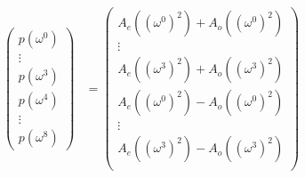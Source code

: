 \begin{align}
\begin{pmatrix}
p(\omega^0)\\
\vdots\\
p(\omega^3)\\
p(\omega^4)\\
\vdots\\
p(\omega^8)
\end{pmatrix}
&=
\begin{pmatrix}
A_e\left(\left(\omega^0\right)^2\right) + A_o\left(\left(\omega^0\right)^2\right) \\
\vdots \\
A_e\left(\left(\omega^3\right)^2\right) + A_o\left(\left(\omega^3\right)^2\right) \\
A_e\left(\left(\omega^0\right)^2\right) - A_o\left(\left(\omega^0\right)^2\right) \\
\vdots \\
A_e\left(\left(\omega^3\right)^2\right) - A_o\left(\left(\omega^3\right)^2\right) \\
\end{pmatrix}
\end{align}
